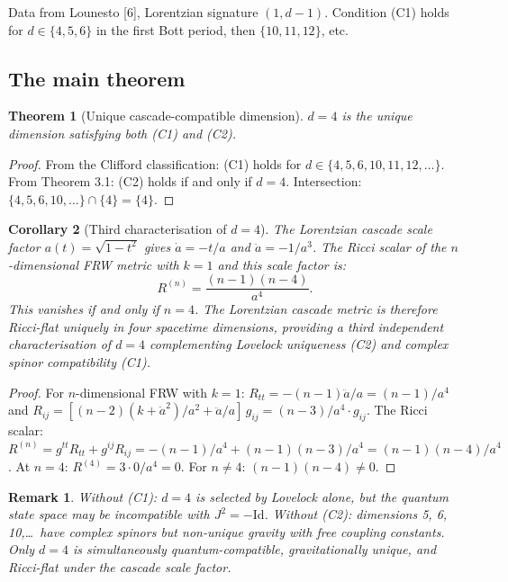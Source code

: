 \documentclass[12pt,a4paper]{article}
\newtheorem{theorem}{Theorem}[section]
\newtheorem{corollary}[theorem]{Corollary}
\newtheorem*{remark}{Remark}
\begin{document}
Data from Lounesto [6], Lorentzian signature $(1, d - 1)$. Condition (C1) holds for
$d \in \{4, 5, 6\}$ in the first Bott period, then $\{10, 11, 12\}$, etc.

\subsection{The main theorem}

\begin{theorem}[Unique cascade-compatible dimension]
$d = 4$ is the unique dimension
satisfying both (C1) and (C2).
\end{theorem}

\begin{proof}
From the Clifford classification: (C1) holds for $d \in \{4, 5, 6, 10, 11, 12, \ldots\}$. From
Theorem 3.1: (C2) holds if and only if $d = 4$. Intersection: $\{4, 5, 6, 10, \ldots\} \cap \{4\} = \{4\}$.
\end{proof}

\begin{corollary}[Third characterisation of $d = 4$]
The Lorentzian cascade scale factor
$a(t) = \sqrt{1 - t^2}$ gives $\dot{a} = -t/a$ and $\ddot{a} = -1/a^3$. The Ricci scalar of the $n$-dimensional
FRW metric with $k = 1$ and this scale factor is:
\[
R^{(n)} = \frac{(n - 1)(n - 4)}{a^4}.
\]
This vanishes if and only if $n = 4$. The Lorentzian cascade metric is therefore Ricci-flat
uniquely in four spacetime dimensions, providing a third independent characterisation of
$d = 4$ complementing Lovelock uniqueness (C2) and complex spinor compatibility (C1).
\end{corollary}

\begin{proof}
For $n$-dimensional FRW with $k = 1$: $R_{tt} = -(n - 1)\ddot{a}/a = (n - 1)/a^4$ and
$R_{ij} = [(n - 2)(k + \dot{a}^2)/a^2 + \ddot{a}/a]\,g_{ij} = (n - 3)/a^4 \cdot g_{ij}$. The Ricci scalar: $R^{(n)} = g^{tt}R_{tt} + g^{ij}R_{ij} =
-(n - 1)/a^4 + (n - 1)(n - 3)/a^4 = (n - 1)(n - 4)/a^4$. At $n = 4$: $R^{(4)} = 3 \cdot 0/a^4 = 0$. For
$n \neq 4$: $(n - 1)(n - 4) \neq 0$.
\end{proof}

\begin{remark}
Without (C1): $d = 4$ is selected by Lovelock alone, but the quantum state
space may be incompatible with $J^2 = -\text{Id}$. Without (C2): dimensions 5, 6, 10,\ldots\ have
complex spinors but non-unique gravity with free coupling constants. Only $d = 4$ is
simultaneously quantum-compatible, gravitationally unique, and Ricci-flat under the cascade
scale factor.
\end{remark}
\end{document}

